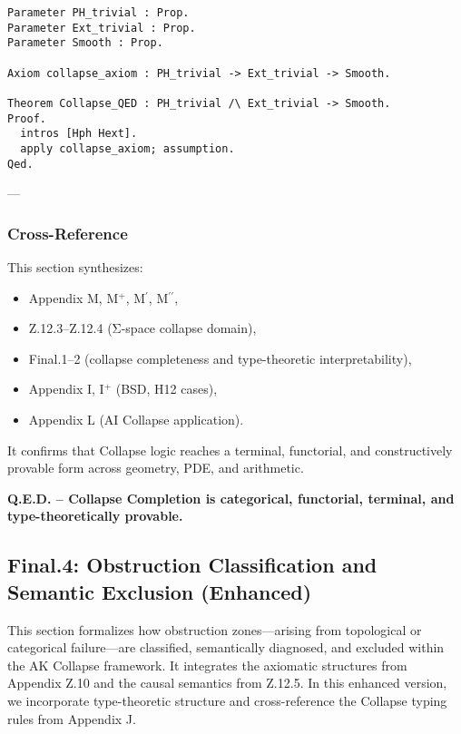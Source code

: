 \documentclass[11pt]{article}
\begin{document}
\begin{axiom}
\begin{axiom}
{{\begin{proposition}
\begin{lstlisting}[language=Coq, caption=Collapse Q.E.D. in Coq]
Parameter PH_trivial : Prop.
Parameter Ext_trivial : Prop.
Parameter Smooth : Prop.

Axiom collapse_axiom : PH_trivial -> Ext_trivial -> Smooth.

Theorem Collapse_QED : PH_trivial /\ Ext_trivial -> Smooth.
Proof.
  intros [Hph Hext].
  apply collapse_axiom; assumption.
Qed.
\end{lstlisting}
\end{proposition}

---

\subsubsection*{Cross-Reference}

This section synthesizes:
\begin{itemize}
  \item Appendix M, M$^+$, M$^\prime$, M$^{\prime\prime}$,
  \item Z.12.3–Z.12.4 (Σ-space collapse domain),
  \item Final.1–2 (collapse completeness and type-theoretic interpretability),
  \item Appendix I, I$^+$ (BSD, H12 cases),  
  \item Appendix L (AI Collapse application).
\end{itemize}

It confirms that Collapse logic reaches a terminal, functorial, and constructively provable form across geometry, PDE, and arithmetic.

\begin{center}
\textbf{Q.E.D. – Collapse Completion is categorical, functorial, terminal, and type-theoretically provable.}
\end{center}



\subsection*{Final.4: Obstruction Classification and Semantic Exclusion (Enhanced)}

This section formalizes how obstruction zones—arising from topological or categorical failure—are classified, semantically diagnosed,  
and excluded within the AK Collapse framework. It integrates the axiomatic structures from Appendix Z.10 and the causal semantics from Z.12.5.  
In this enhanced version, we incorporate type-theoretic structure and cross-reference the Collapse typing rules from Appendix J.

}}
\end{axiom}
\end{axiom}
\end{document}
